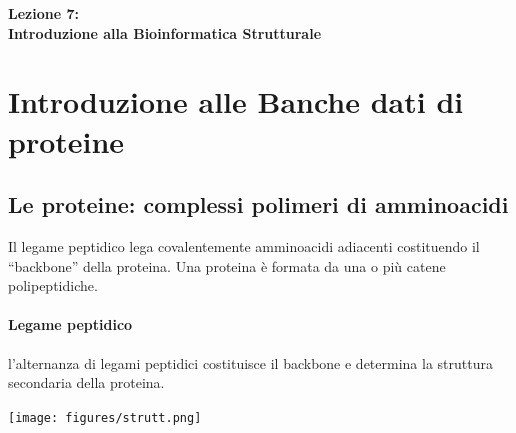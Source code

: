 \documentclass{article}
\begin{document}
\begin{titlepage}
    \begin{center}
        \vspace*{1cm}
        \LARGE
        \textbf{Lezione 7:\\ Introduzione alla Bioinformatica Strutturale}

    \end{center}
\end{titlepage}
\setcounter{page}{69}
\section{Introduzione alle Banche dati di proteine}
\subsection{Le proteine: complessi polimeri di amminoacidi}
Il legame peptidico lega covalentemente amminoacidi
adiacenti costituendo il “backbone” della proteina. Una
proteina è formata da una o più catene polipeptidiche.
\paragraph{Legame peptidico}
l'alternanza di legami
peptidici costituisce il
backbone e determina la struttura secondaria della proteina.
\begin{center}
    \texttt{[image: figures/strutt.png]}
\end{center}
\end{document}
